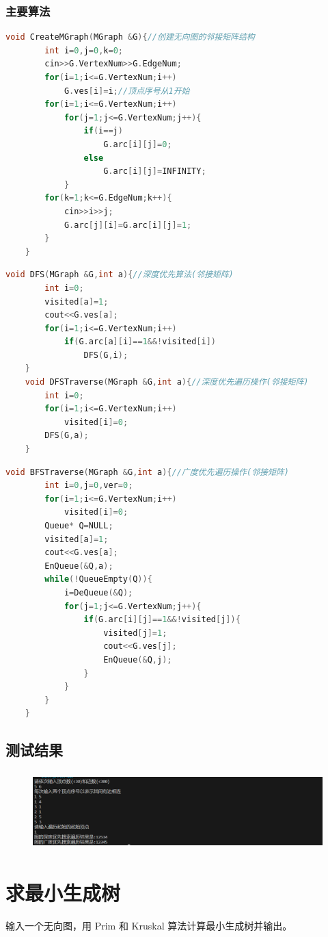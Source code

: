 \documentclass{ctexart}
\begin{document}
	\subsubsection{主要算法}
	\begin{lstlisting}[language=C++, caption=创建无向图的邻接矩阵结构]
		void CreateMGraph(MGraph &G){//创建无向图的邻接矩阵结构
		int i=0,j=0,k=0;
		cin>>G.VertexNum>>G.EdgeNum;
		for(i=1;i<=G.VertexNum;i++)
			G.ves[i]=i;//顶点序号从1开始
		for(i=1;i<=G.VertexNum;i++)
			for(j=1;j<=G.VertexNum;j++){
				if(i==j)
					G.arc[i][j]=0;
				else
					G.arc[i][j]=INFINITY;
			}
		for(k=1;k<=G.EdgeNum;k++){
			cin>>i>>j;
			G.arc[j][i]=G.arc[i][j]=1;   
		}
	}
	\end{lstlisting}
	\begin{lstlisting}[language=C++, caption=深度优先搜索算法]
		void DFS(MGraph &G,int a){//深度优先算法(邻接矩阵)
		int i=0;
		visited[a]=1;
		cout<<G.ves[a];
		for(i=1;i<=G.VertexNum;i++)
			if(G.arc[a][i]==1&&!visited[i])
				DFS(G,i);
	}
	void DFSTraverse(MGraph &G,int a){//深度优先遍历操作(邻接矩阵)
		int i=0;
		for(i=1;i<=G.VertexNum;i++)
			visited[i]=0;
		DFS(G,a);
	}
	\end{lstlisting}
	\begin{lstlisting}[language=C++, caption=广度优先搜索算法]
		void BFSTraverse(MGraph &G,int a){//广度优先遍历操作(邻接矩阵)
		int i=0,j=0,ver=0;
		for(i=1;i<=G.VertexNum;i++)
			visited[i]=0;
		Queue* Q=NULL;
		visited[a]=1;
		cout<<G.ves[a];
		EnQueue(&Q,a);
		while(!QueueEmpty(Q)){
			i=DeQueue(&Q);
			for(j=1;j<=G.VertexNum;j++){
				if(G.arc[i][j]==1&&!visited[j]){
					visited[j]=1;
					cout<<G.ves[j];
					EnQueue(&Q,j);
				}
			}
		}	
	}	
	\end{lstlisting}
	\subsection{测试结果}
	\begin{figure}[H]
		\centering 
		\includegraphics[height=3cm,width=12cm]{1.png}
		\end{figure}
\section{求最小生成树}
输入一个无向图，用 Prim 和 Kruskal 算法计算最小生成树并输出。
\end{document}
